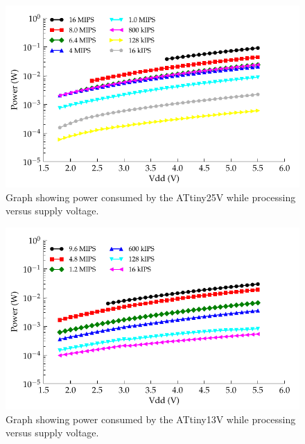       \begin{figure}
      \centering
        \includegraphics{content/pt1/03-EnergyRequirements/graphics/Graph_ATtiny25V_Clock_Power}
        \caption{\label{graph:CLK_POWER_ATtiny25V}Graph showing power consumed by the ATtiny25V while processing versus supply voltage.}
      \end{figure}

      \begin{figure}
        \centering
        \includegraphics{content/pt1/03-EnergyRequirements/graphics/Graph_ATtiny13V_Clock_Power}
        \caption{\label{graph:CLK_POWER_ATtiny13V}Graph showing power consumed by the ATtiny13V while processing versus supply voltage.}
      \end{figure}

